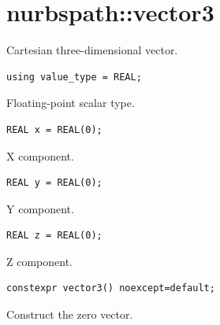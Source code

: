 \section{nurbspath::vector3}
Cartesian three-dimensional vector.
\par\noindent\begin{minipage}{\linewidth}
\begin{lstlisting}[style=apireference]
using value_type = REAL;
\end{lstlisting}
{\footnotesize Floating-point scalar type.\par}
\end{minipage}\par\vspace{1pt}
\par\noindent\begin{minipage}{\linewidth}
\begin{lstlisting}[style=apireference]
REAL x = REAL(0);
\end{lstlisting}
{\footnotesize X component.\par}
\end{minipage}\par\vspace{1pt}
\par\noindent\begin{minipage}{\linewidth}
\begin{lstlisting}[style=apireference]
REAL y = REAL(0);
\end{lstlisting}
{\footnotesize Y component.\par}
\end{minipage}\par\vspace{1pt}
\par\noindent\begin{minipage}{\linewidth}
\begin{lstlisting}[style=apireference]
REAL z = REAL(0);
\end{lstlisting}
{\footnotesize Z component.\par}
\end{minipage}\par\vspace{1pt}
\par\noindent\begin{minipage}{\linewidth}
\begin{lstlisting}[style=apireference]
constexpr vector3() noexcept=default;
\end{lstlisting}
{\footnotesize Construct the zero vector.\par}
\end{minipage}\par\vspace{1pt}
